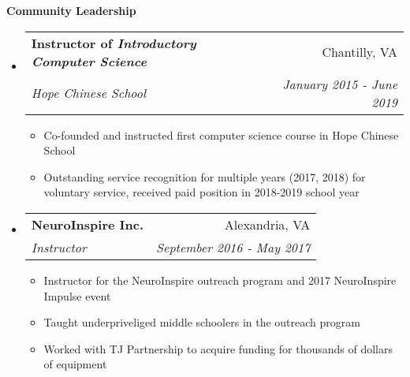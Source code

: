 \documentclass[letterpaper,11pt]{article}
\makeatletter
\newcommand{\resitem}[1]{\item #1 \vspace{-2pt}}
\newcommand{\resheading}[1]{{\large \colorbox{mygrey}{\begin{minipage}{\textwidth}{\textbf{#1 \vphantom{p\^{E}}}}\end{minipage}}}}
\newcommand{\ressubheading}[4]{
\begin{tabular*}{7.0in}{l@{\extracolsep{\fill}}r}
		\textbf{#1} & #2 \\
		\textit{#3} & \textit{#4} \\
\end{tabular*}\vspace{-6pt}}
\makeatother
\begin{document}
\resheading{Community Leadership}
\begin{itemize}
\item
	\ressubheading{Instructor of \textit{Introductory Computer Science}}{Chantilly, VA}{Hope Chinese School}{January 2015 - June 2019}
	\begin{itemize}
	    \resitem{Co-founded and instructed first computer science course in Hope Chinese School}
	    \resitem{Outstanding service recognition for multiple years (2017, 2018) for voluntary service, received paid position in 2018-2019 school year}
	\end{itemize}
\item
	\ressubheading{NeuroInspire Inc.}{Alexandria, VA}{Instructor}{September 2016 - May 2017}
	\begin{itemize}
		\resitem{Instructor for the NeuroInspire outreach program and 2017 NeuroInspire Impulse event}
		\resitem{Taught underpriveliged middle schoolers in the outreach program}
		\resitem{Worked with TJ Partnership to acquire funding for thousands of dollars of equipment}
	\end{itemize}
	
\end{itemize}
\end{document}
